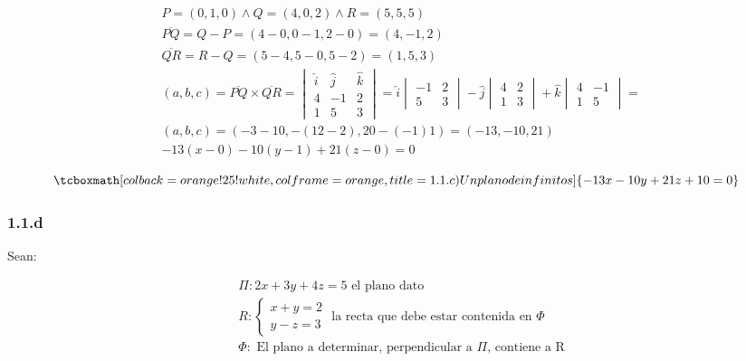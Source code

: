 \documentclass{article}
\begin{document}
\begin{subequations}
\begin{align}
& P = (0, 1, 0) \wedge Q = (4, 0, 2) \wedge R = (5, 5, 5) \\
& \overline{PQ} = Q - P = (4-0, 0-1, 2-0) = (4, -1, 2) \\
& \overline{QR} = R - Q = (5-4, 5-0, 5-2) = (1, 5, 3) \\
& (a, b, c) = \overline{PQ} \times \overline{QR} = \begin{vmatrix}
\hat{i} & \hat{j} & \hat{k} \\
4 & -1 & 2 \\
1 & 5 & 3
\end{vmatrix} = \hat{i} \begin{vmatrix}
-1 & 2 \\
5 & 3
\end{vmatrix} -\hat{j} \begin{vmatrix}
4 & 2 \\
1 & 3
\end{vmatrix} +\hat{k} \begin{vmatrix}
4 & -1 \\
1 & 5
\end{vmatrix} = \\
& (a, b, c) = (-3-10, -(12-2), 20-(-1)1) = (-13, -10, 21) \\
& -13 (x-0) -10 (y-1) +21 (z-0) = 0
\end{align}
\end{subequations}

\begin{equation}
\tcboxmath[colback=orange!25!white,colframe=orange,title=1.1.c) Un plano de infinitos]
{ -13x - 10y + 21z + 10 = 0 }
\end{equation}

\subsubsection*{1.1.d}
\label{subsubsec:1.1.d}

Sean:

\begin{subequations}
\begin{align}
& \Pi: 2x + 3y + 4z = 5 \text{ el plano dato} \\
& R: \left\{ \begin{array}{ll}
x + y = 2 \\
y - z = 3
\end{array} \right. \text{ la recta que debe estar contenida en } \Phi \\
& \Phi: \text{ El plano a determinar, perpendicular a } \Pi \text{, contiene a R}
\end{align}
\end{subequations}
\end{document}
